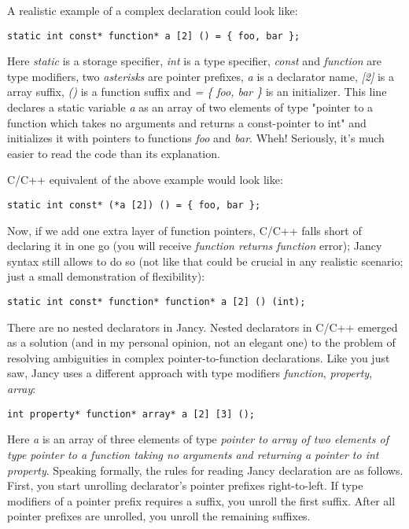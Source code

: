 \documentclass[oneside]{book}
\begin{document}
A realistic example of a complex declaration could look like:

\begin{lstlisting}
static int const* function* a [2] () = { foo, bar };
\end{lstlisting}

Here \emph{static} is a storage specifier, \emph{int} is a type specifier, \emph{const} and \emph{function} are type modifiers, two \emph{asterisks} are pointer prefixes, \emph{a} is a declarator name, \emph{[2]} is a array suffix, \emph{()} is a function suffix and \emph{= \{ foo, bar \}} is an initializer. This line declares a static variable \emph{a} as an array of two elements of type "pointer to a function which takes no arguments and returns a const-pointer to int" and initializes it with pointers to functions \emph{foo} and \emph{bar}. Wheh! Seriously, it's much easier to read the code than its explanation.

C/C++ equivalent of the above example would look like:

\begin{lstlisting}
static int const* (*a [2]) () = { foo, bar };
\end{lstlisting}

Now, if we add one extra layer of function pointers, C/C++ falls short of declaring it in one go (you will receive \emph{function returns function} error); Jancy syntax still allows to do so (not like that could be crucial in any realistic scenario; just a small demonstration of flexibility):

\begin{lstlisting}
static int const* function* function* a [2] () (int);
\end{lstlisting}

There are no nested declarators in Jancy. Nested declarators in C/C++ emerged as a solution (and in my personal opinion, not an elegant one) to the problem of resolving ambiguities in complex pointer-to-function declarations. Like you just saw, Jancy uses a different approach with type modifiers \emph{function}, \emph{property}, \emph{array}:

\begin{lstlisting}
int property* function* array* a [2] [3] ();
\end{lstlisting}

Here \emph{a} is an array of three elements of type \emph{pointer to array of two elements of type pointer to a function taking no arguments and returning a pointer to int property}. Speaking formally, the rules for reading Jancy declaration are as follows. First, you start unrolling declarator's pointer prefixes right-to-left. If type modifiers of a pointer prefix requires a suffix, you unroll the first suffix. After all pointer prefixes are unrolled, you unroll the remaining suffixes. 
\end{document}
